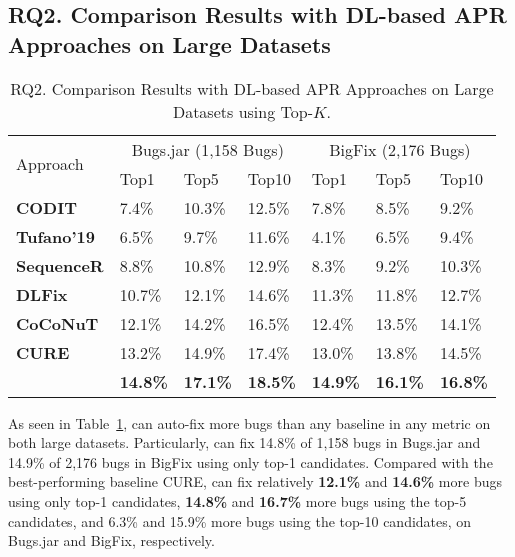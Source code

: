 \subsection{\bf RQ2. Comparison Results with DL-based APR Approaches on Large Datasets}

\begin{table}[t]
	\caption{RQ2. Comparison Results with DL-based APR Approaches on Large Datasets using Top-$K$.}
	\vspace{-10pt}
        {\small
	\begin{center}
		\renewcommand{\arraystretch}{1}
		\begin{tabular}{p{1.6cm}|p{0.7cm}|p{0.7cm}|p{0.7cm}|p{0.7cm}|p{0.7cm}|p{0.7cm}}\hline
			\multirow{2}{*}{Approach}&\multicolumn{3}{c|}{Bugs.jar (1,158 Bugs)}&\multicolumn{3}{c}{BigFix (2,176 Bugs)}\\\cline{2-7}
		                          & Top1   & Top5   & Top10  & Top1   & Top5   & Top10\\
			\hline
			\textbf{CODIT}        & 7.4\%  & 10.3\% & 12.5\% & 7.8\%  & 8.5\%  & 9.2\%\\
			\textbf{Tufano'19}  & 6.5\%  & 9.7\%  & 11.6\% & 4.1\%  & 6.5\%  & 9.4\%\\
			\textbf{SequenceR}    & 8.8\%  & 10.8\% & 12.9\% & 8.3\%  & 9.2\%  & 10.3\%\\
			\textbf{DLFix}        & 10.7\% & 12.1\% & 14.6\% & 11.3\% & 11.8\% & 12.7\%\\
			\textbf{CoCoNuT}      & 12.1\% & 14.2\% & 16.5\% & 12.4\% & 13.5\% & 14.1\%\\
			\textbf{CURE}         & 13.2\% & 14.9\% & 17.4\% & 13.0\% & 13.8\% & 14.5\%\\
			\hline
			\textbf{\tool}        & \textbf{14.8\%} & \textbf{17.1\%} & \textbf{18.5\%} & \textbf{14.9\%} & \textbf{16.1\%} & \textbf{16.8\%}\\
			\hline
		\end{tabular}
		\label{RQ2_results}
	\end{center}
        }
\end{table}


As seen in Table~\ref{RQ2_results}, {\tool} can auto-fix more bugs
than any baseline in any metric on both large datasets.  Particularly,
{\tool} can fix 14.8\% of 1,158 bugs in Bugs.jar and 14.9\% of 2,176
bugs in BigFix using only top-1 candidates. Compared with the
best-performing baseline CURE, {\tool} can fix relatively {\bf 12.1\%}
and {\bf 14.6\%} more bugs using only top-1 candidates, {\bf 14.8\%}
and {\bf 16.7\%} more bugs using the top-5 candidates, and 6.3\% and
15.9\% more bugs using the top-10 candidates, on Bugs.jar and BigFix,
respectively.
